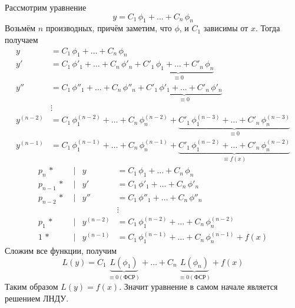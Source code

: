 \begin{Proof}
    Рассмотрим уравнение 
    \[
        y = C_1\,\phi_1 + \dots + C_n\,\phi_n
    \]
    Возьмём $n$ производных, причём заметим, что $\phi$, и $C_1$ зависимы от $x$. Тогда получаем
    \begin{align*}
        y &= C_1\,\phi_1 + \dots + C_n\,\phi_n\\
        y' &= C_1\,\phi'_1 + \dots + C_n\,\phi'_n +  \underbrace{C'_1\,\phi_1 + \dots + C'_n\,\phi_n}_{\equiv 0}\\
        y'' &= C_1\,\phi''_1 + \dots + C_n\,\phi''_n + \underbrace{C'_1\,\phi'_1 + \dots + C'_n\,\phi'_n}_{\equiv 0}\\
        &\vdots\\
        y^{(n-2)} &= C_1\,\phi_1^{(n-2)} + \dots + C_n\,\phi_n^{(n-2)} + \underbrace{C'_1\,\phi^{(n-3)}_1 + \dots + C'_n\,\phi^{(n-3)}_n}_{\equiv 0}\\
        y^{(n-1)} &= C_1\,\phi_1^{(n-1)} + \dots + C_n\,\phi_n^{(n-1)} + \underbrace{C'_1\,\phi^{(n-2)}_1 + \dots + C'_n\,\phi^{(n-2)}_n}_{\equiv f(x)}
    \end{align*}
    \begin{align*}
        p_n\,* \; &| &y &= C_1\,\phi_1 + \dots + C_n\,\phi_n\\
        p_{n-1}\,*\; &| &y' &= C_1\,\phi'_1 + \dots + C_n\,\phi'_n\\
        p_{n-2}\,*\; &| & y'' &= C_1\,\phi''_1 + \dots + C_n\,\phi''_n\\
        & & &\vdots\\
        p_1\,*\; &| &y^{(n-2)} &= C_1\,\phi_1^{(n-2)} + \dots + C_n\,\phi_n^{(n-2)}\\
        1\,*\; &| &y^{(n-1)} &= C_1\,\phi_1^{(n-1)} + \dots + C_n\,\phi_n^{(n-1)} +  f(x)
    \end{align*}
    Сложим все функции, получим
    \[
        L(y) = C_1\,\underbrace{L(\phi_1)}_{\equiv 0 (\text{ФСР})} + \dots + C_n\,\underbrace{L(\phi_n)}_{\equiv 0 (\text{ФСР})} + f(x) 
    \]
    Таким образом $L(y) = f(x)$. Значит уравнение в самом начале является решением ЛНДУ.\\
    

\end{Proof}
